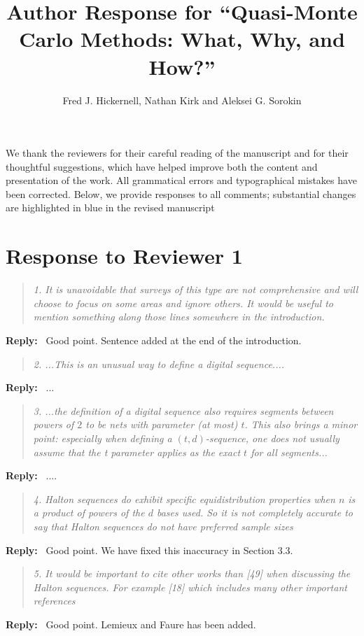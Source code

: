 \documentclass[11pt]{article}
\title{Author Response for “Quasi-Monte Carlo Methods: What, Why, and How?”}
\author{Fred J. Hickernell, Nathan Kirk and Aleksei G. Sorokin}
\date{}
\newenvironment{response}{%
  \vspace{1em}
  \begin{quote}\itshape
}{%
  \end{quote}
  \noindent\textbf{Reply:}~
}
\begin{document}
\maketitle

We thank the reviewers for their careful reading of the manuscript and for their thoughtful suggestions, which have helped improve both the content and presentation of the work. All grammatical errors and typographical mistakes have been corrected. Below, we provide responses to all comments; substantial changes are highlighted in blue in the revised manuscript

\section*{Response to Reviewer 1}

\begin{response}{1.}
It is unavoidable that surveys of this type are not comprehensive and will choose to focus
on some areas and ignore others. It would be useful to mention something along those lines
somewhere in the introduction.
\end{response}
Good point. Sentence added at the end of the introduction.

\begin{response}{2.}
...This is an unusual way to define a digital
sequence....
\end{response}
...


\begin{response}{3.}
...the definition of a digital sequence also requires segments between powers of $2$ to be nets with parameter (at most) $t$. This also brings a minor point: especially when defining a $(t, d)$-sequence, one does not usually assume that the t parameter applies as the exact $t$ for all segments...
\end{response}
....


\begin{response}{4.}
Halton sequences do exhibit specific equidistribution properties when $n$ is a product of powers of the $d$ bases used. So it is not completely accurate to say that Halton sequences do not have preferred sample sizes
\end{response}
Good point. We have fixed this inaccuracy in Section 3.3.



\begin{response}{5.}
    It would be important to cite other works than [49] when discussing the Halton sequences. For example [18] which includes many other important references
\end{response}
Good point. Lemieux and Faure has been added.
\end{document}
